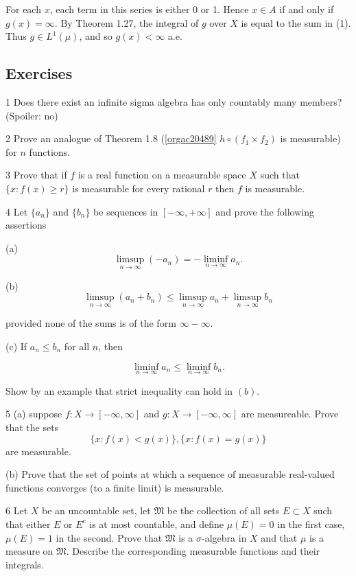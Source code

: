 \documentclass[11pt]{article}
\begin{document}
For each \(x\), each term in this series is either 0 or 1. Hence \(x \in A\) if and only if \(g(x) = \infty\). By Theorem 1.27, the integral of \(g\) over \(X\) is equal to the sum in (1). Thus \(g \in L^{1}(\mu)\), and so \(g(x) < \infty\) a.e.
\subsection{Exercises}
\label{sec:org64c0a04}

1 Does there exist an infinite sigma algebra has only countably many members?
   (Spoiler: no)

2 Prove an analogue of Theorem 1.8 (\ref{orgac20489} \(h\circ(f_1 \times f_2)\) is measurable) for \(n\) functions.

3 Prove that if \(f\) is a real function on a measurable space \(X\) such that \(\{x \colon f(x)\ge r\}\) is measurable for every rational \(r\) then \(f\) is measurable.

4 Let \(\{a_{n}\}\) and \(\{b_{n}\}\) be sequences in \([-\infty, +\infty]\) and prove the following assertions

(a) \[\mathop{\lim\sup}_{n\to \infty}(-a_{n}) = -\mathop{\lim\inf}_{n \to \infty} a_{n}.\]

(b) \[\mathop{\lim\sup}_{n\to \infty} (a_{n} + b_{n}) \le \mathop{\lim\sup}_{n\to \infty} a _{n} + \mathop{\lim\sup}_{n \to\infty}b_{n}\]

provided none of the sums is of the form \(\infty - \infty\).

(c) If \(a_{n} \leq b_{n}\) for all \(n\), then

\[
\liminf_{n \to \infty} a_{n} \leq \liminf_{n \to \infty} b_{n}.
\]

Show by an example that strict inequality can hold in \((b)\).

5 (a) suppose \(f\colon X \to [- \infty, \infty]\) and \(g \colon X \to [- \infty, \infty]\) are measureable. Prove that the sets
\[\{x \colon f(x) < g(x)\}, \{x \colon f(x) = g(x)\}\]
are measurable.

(b) Prove that the set of points at which a sequence of measurable real-valued functions converges (to a finite limit) is measurable.

6 Let \(X\) be an uncountable set, let \(\mathfrak{M}\) be the collection of all sets \(E \subset X\) such that either \(E\) or \(E^c\) is at most countable, and define \(\mu(E) = 0\) in the first case, \(\mu(E) = 1\) in the second. Prove that \(\mathfrak{M}\) is a \(\sigma\)-algebra in \(X\) and that \(\mu\) is a measure on \(\mathfrak{M}\). Describe the corresponding measurable functions and their integrals.
\end{document}
